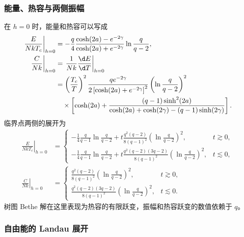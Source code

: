 \subsubsection{能量、热容与两侧振幅}

在 \(h=0\) 时，能量和热容可以写成
\begin{align*}
\left.\frac{E}{NkT_c}\right|_{h=0}
&=-\frac q4
\frac{\cosh(2a)-e^{-2\gamma}}
{\cosh(2a)+e^{-2\gamma}}
\ln\frac q{q-2},\\
\left.\frac{C}{Nk}\right|_{h=0}
&=\left.\frac1{Nk}\frac{\d E}{\d T}\right|_{h=0}\\
&=\left(\frac{T_c}{T}\right)^2
\frac{qe^{-2\gamma}}
{2\left[\cosh(2a)+e^{-2\gamma}\right]^2}
\left(\ln\frac q{q-2}\right)^2\\
&\quad\times\left[
\cosh(2a)+
\frac{(q-1)\sinh^2(2a)}
{\cosh(2a)+\cosh(2\gamma)-(q-1)\sinh(2\gamma)}
\right].
\end{align*}
临界点两侧的展开为
\begin{align*}
\left.\frac{E}{NkT_c}\right|_{h=0}
&=
\begin{cases}
\displaystyle-\frac14\frac q{q-1}\ln\frac q{q-2}
+t\frac{q^2(q-2)}{8(q-1)^2}
\left(\ln\frac q{q-2}\right)^2,&t\gtrsim0,\\[6pt]
\displaystyle-\frac14\frac q{q-1}\ln\frac q{q-2}
+t\frac{q^2(q-2)(3q-2)}{8(q-1)^2}
\left(\ln\frac q{q-2}\right)^2,&t\lesssim0,
\end{cases}\\
\left.\frac{C}{Nk}\right|_{h=0}
&=
\begin{cases}
\displaystyle
\frac{q^2(q-2)}{8(q-1)^2}
\left(\ln\frac q{q-2}\right)^2,&t\gtrsim0,\\[6pt]
\displaystyle
\frac{q^2(q-2)(3q-2)}{8(q-1)^2}
\left(\ln\frac q{q-2}\right)^2,&t\lesssim0.
\end{cases}
\end{align*}
树图 Bethe 解在这里表现为热容的有限跃变，振幅和热容跃变的数值依赖于 \(q\)。

\subsubsection{自由能的 Landau 展开}

